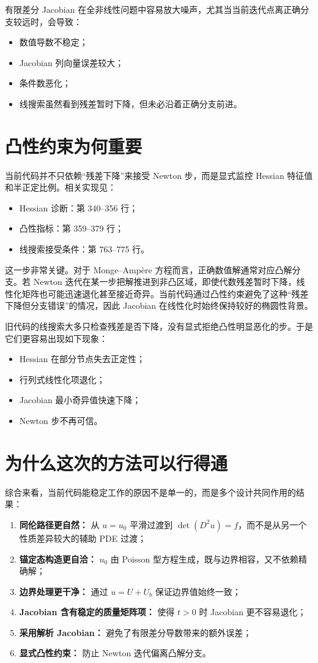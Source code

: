 \documentclass[11pt,a4paper]{article}
\begin{document}
有限差分 Jacobian 在全非线性问题中容易放大噪声，尤其当当前迭代点离正确分支较远时，会导致：
\begin{itemize}[leftmargin=2em]
\item 数值导数不稳定；
\item Jacobian 列向量误差较大；
\item 条件数恶化；
\item 线搜索虽然看到残差暂时下降，但未必沿着正确分支前进。
\end{itemize}

\section{凸性约束为何重要}
当前代码并不只依赖“残差下降”来接受 Newton 步，而是显式监控 Hessian 特征值和半正定比例。相关实现见：
\begin{itemize}[leftmargin=2em]
\item Hessian 诊断：第 340--356 行；
\item 凸性指标：第 359--379 行；
\item 线搜索接受条件：第 763--775 行。
\end{itemize}

这一步非常关键。对于 Monge--Amp\`ere 方程而言，正确数值解通常对应凸解分支。若 Newton 迭代在某一步把解推进到非凸区域，即使代数残差暂时下降，线性化矩阵也可能迅速退化甚至接近奇异。当前代码通过凸性约束避免了这种“残差下降但分支错误”的情况，因此 Jacobian 在线性化时始终保持较好的椭圆性背景。

旧代码的线搜索大多只检查残差是否下降，没有显式拒绝凸性明显恶化的步。于是它们更容易出现如下现象：
\begin{itemize}[leftmargin=2em]
\item Hessian 在部分节点失去正定性；
\item 行列式线性化项退化；
\item Jacobian 最小奇异值快速下降；
\item Newton 步不再可信。
\end{itemize}

\section{为什么这次的方法可以行得通}
综合来看，当前代码能稳定工作的原因不是单一的，而是多个设计共同作用的结果：
\begin{enumerate}[leftmargin=2em]
\item \textbf{同伦路径更自然：} 从 $u=u_0$ 平滑过渡到 $\det(D^2u)=f$，而不是从另一个性质差异较大的辅助 PDE 过渡；
\item \textbf{锚定态构造更自洽：} $u_0$ 由 Poisson 型方程生成，既与边界相容，又不依赖精确解；
\item \textbf{边界处理更干净：} 通过 $u=U+U_b$ 保证边界值始终一致；
\item \textbf{Jacobian 含有稳定的质量矩阵项：} 使得 $t>0$ 时 Jacobian 更不容易退化；
\item \textbf{采用解析 Jacobian：} 避免了有限差分导数带来的额外误差；
\item \textbf{显式凸性约束：} 防止 Newton 迭代偏离凸解分支。
\end{enumerate}
\end{document}
